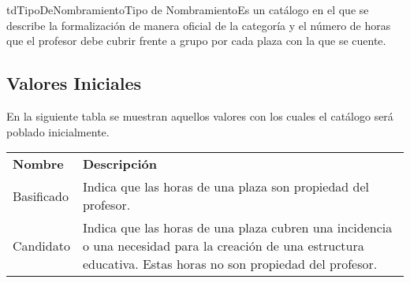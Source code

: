 	\begin{TipoDeDato}{tdTipoDeNombramiento}{Tipo de Nombramiento}{Es un catálogo en el que se describe la formalización de manera oficial de la categoría y el número de horas que el profesor debe cubrir frente a grupo por cada plaza con la que se cuente.}
	
		\begin{tdAtributos}
			
		\end{tdAtributos}
		
		\subsection{Valores Iniciales}	
	En la siguiente tabla se muestran aquellos valores con los cuales el catálogo será poblado inicialmente. \cdtEmpty
		\begin{longtable}{| p{}| p{}|}
	 			\rowcolor{colorPrincipal}
	 			\multicolumn{2}{|c|}{\bf \color{white} Valores Iniciales}\\
	 			\hline
	 			\rowcolor{colorSecundario}
	 			\bf \color{white} Nombre & \bf \color{white}  Descripción \\
	 			\hline
	 			\endhead
	 			Basificado & Indica que las horas de una plaza son propiedad del profesor. \\
	 			\hline
	 			Candidato & Indica que las horas de una plaza cubren una incidencia o una necesidad para la creación de una estructura educativa. Estas horas no son propiedad del profesor. \\
	 			\hline
	 		\end{longtable}
	\end{TipoDeDato}
	
